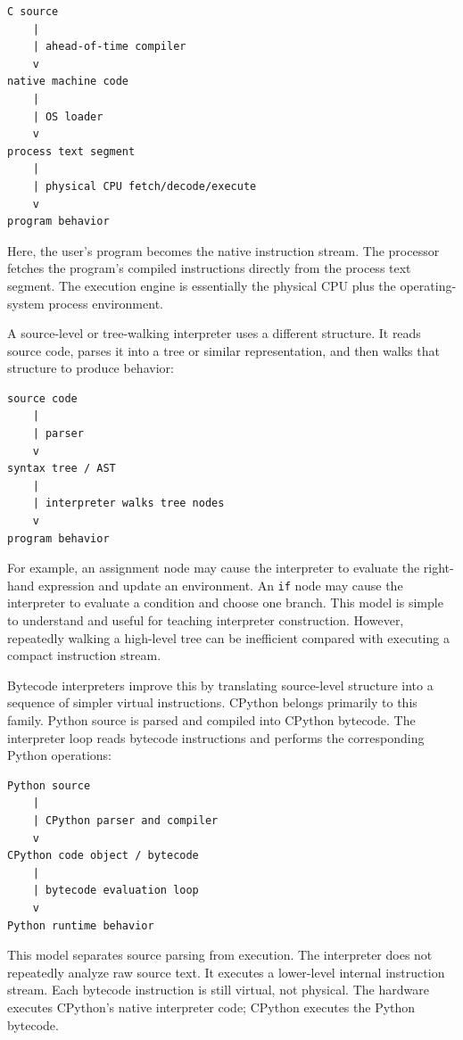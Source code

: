 \documentclass[a4paper,twoside]{report}
\begin{document}
\begin{verbatim}
C source
    |
    | ahead-of-time compiler
    v
native machine code
    |
    | OS loader
    v
process text segment
    |
    | physical CPU fetch/decode/execute
    v
program behavior
\end{verbatim}

Here, the user's program becomes the native instruction stream. The processor fetches the program's compiled instructions directly from the process text segment. The execution engine is essentially the physical CPU plus the operating-system process environment.

A source-level or tree-walking interpreter uses a different structure. It reads source code, parses it into a tree or similar representation, and then walks that structure to produce behavior:

\begin{verbatim}
source code
    |
    | parser
    v
syntax tree / AST
    |
    | interpreter walks tree nodes
    v
program behavior
\end{verbatim}

For example, an assignment node may cause the interpreter to evaluate the right-hand expression and update an environment. An \texttt{if} node may cause the interpreter to evaluate a condition and choose one branch. This model is simple to understand and useful for teaching interpreter construction. However, repeatedly walking a high-level tree can be inefficient compared with executing a compact instruction stream.

Bytecode interpreters improve this by translating source-level structure into a sequence of simpler virtual instructions. CPython belongs primarily to this family. Python source is parsed and compiled into CPython bytecode. The interpreter loop reads bytecode instructions and performs the corresponding Python operations:

\begin{verbatim}
Python source
    |
    | CPython parser and compiler
    v
CPython code object / bytecode
    |
    | bytecode evaluation loop
    v
Python runtime behavior
\end{verbatim}

This model separates source parsing from execution. The interpreter does not repeatedly analyze raw source text. It executes a lower-level internal instruction stream. Each bytecode instruction is still virtual, not physical. The hardware executes CPython's native interpreter code; CPython executes the Python bytecode.
\end{document}
